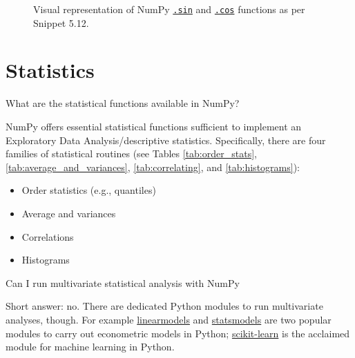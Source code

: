 \documentclass[a4paper,11pt]{book}
\newcommand{\question}[1]{%
    \begin{tcolorbox}[colback=comp_c!10,colframe=comp_c,sidebyside align=top,width=\linewidth,before skip=1ex]
        #1
    \end{tcolorbox}
    \switchcolumn%
}
\newcommand{\note}[1]{%
    \begin{tcolorbox}[colback=white!0,colframe=white!10,width=\linewidth,before skip=1ex]
        #1
    \end{tcolorbox}
}
\begin{document}
\begin{figure}[!htbp]
	\centering
	
	
	\caption{Visual representation of NumPy \href{https://numpy.org/doc/stable/reference/generated/numpy.sin.html\#numpy.sin}{\texttt{.sin}} and \href{https://numpy.org/doc/stable/reference/generated/numpy.cos.html\#numpy.cos}{\texttt{.cos}} functions as per Snippet 5.12.}
\end{figure}

\section{Statistics}

\begin{paracol}{2}
	\question{\raggedright What are the statistical functions available in NumPy?}
	\note{NumPy offers essential statistical functions sufficient to implement an Exploratory Data Analysis/descriptive statistics. Specifically, there are four families of statistical routines (see Tables \ref{tab:order_stats}, \ref{tab:average_and_variances}, \ref{tab:correlating}, and \ref{tab:histograms}):
	
	\begin{itemize}
		\item Order statistics (e.g., quantiles)
		\item Average and variances
		\item Correlations 
		\item Histograms
	\end{itemize}
	}
\end{paracol}

\begin{paracol}{2}
	\question{\raggedright Can I run multivariate statistical analysis with NumPy}
	\note{Short answer: no. There are dedicated Python modules to run multivariate analyses, though. For example \href{https://bashtage.github.io/linearmodels/index.html}{linearmodels} and \href{https://www.statsmodels.org/stable/generated/statsmodels.sandbox.regression.gmm.IV2SLS.html?highlight=2sls#statsmodels.sandbox.regression.gmm.IV2SLS}{statsmodels} are two popular modules to carry out econometric models in Python; \href{https://scikit-learn.org/stable/}{scikit-learn} is the acclaimed module for machine learning in Python.}
\end{paracol}
\clearpage
\end{document}
